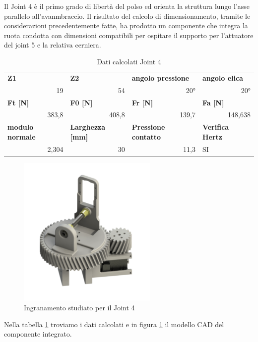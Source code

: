 \documentclass[%
corpo=11pt,
twoside,
 stile=classica,
oldstyle,
greek,%
]{toptesi}
\begin{document}
		Il Joint 4 è il primo grado di libertà del polso ed orienta la struttura lungo l'asse parallelo all'avanmbraccio. 
		Il risultato del calcolo di dimensionamento, tramite le considerazioni precedentemente fatte, ha prodotto un componente  che integra la ruota condotta con dimensioni compatibili per ospitare il supporto per l'attuatore del joint 5 e la relativa cerniera.
		\begin{table}[H]
			\centering
			\caption{Dati calcolati Joint 4}
			\begin{tabular}{rrrl}
				\multicolumn{1}{l}{\textbf{Z1}} & \multicolumn{1}{l}{\textbf{Z2}} & \multicolumn{1}{l}{\textbf{angolo pressione}} & \textbf{angolo elica} \\
				19    & 54    & 20°    & \multicolumn{1}{r}{20°} \\
				\multicolumn{1}{l}{\textbf{Ft [N]}} & \multicolumn{1}{l}{\textbf{F0 [N]}} & \multicolumn{1}{l}{\textbf{Fr [N]}} & \textbf{Fa [N]} \\
				383,8 & 408,8 & 139,7 & \multicolumn{1}{r}{148,638} \\
				\multicolumn{1}{l}{\textbf{modulo normale}} & \multicolumn{1}{l}{\textbf{Larghezza [mm]}} & \multicolumn{1}{l}{\textbf{Pressione contatto}} & \textbf{Verifica Hertz} \\
				2,304 & 30    & 11,3  & SI \\
			\end{tabular}%
			\label{tab:lewis1}%
		\end{table}%
	
	
		\begin{figure} [H]
			\centering
			\includegraphics[width=0.6\textwidth]{Plots/POLSO1/wrist1.png}
			\caption{Ingranamento studiato per il Joint 4}
			\label{fig:wrist1}
		\end{figure} 
		Nella tabella \ref{tab:lewis1} troviamo i dati calcolati e in figura \ref{fig:wrist1} il modello CAD del componente integrato. 
	
\end{document}

